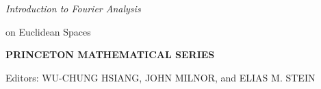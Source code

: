
\thispagestyle{empty}
\vspace*{\fill}
\begin{center}
\large\itshape Introduction to Fourier Analysis

on Euclidean Spaces
\end{center}
\vfill
\cleardoublepage

\thispagestyle{empty}
\begin{center}
\bfseries PRINCETON MATHEMATICAL SERIES
\end{center}
\vspace{2ex}
\begin{center}
Editors: WU-CHUNG HSIANG, JOHN MILNOR, and ELIAS M. STEIN
\end{center}
\vspace{2ex}

